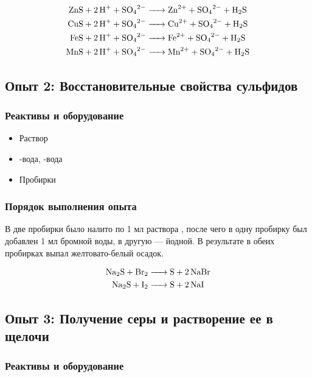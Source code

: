 \documentclass[a4paper, 12pt]{article}
\begin{document}
\begin{align}
	\ce{ZnS + 2H+ + SO4^2- &-> Zn^2+ + SO4^2- + H2S}\\
	\ce{CuS + 2H+ + SO4^2- &-> Cu^2+ + SO4^2- + H2S}\\
	\ce{FeS + 2H+ + SO4^2- &-> Fe^2+ + SO4^2- + H2S}\\
	\ce{MnS + 2H+ + SO4^2- &-> Mn^2+ + SO4^2- + H2S}
\end{align}

\subsection{Опыт 2: Восстановительные свойства сульфидов}

\subsubsection{Реактивы и оборудование}

\begin{itemize}
	\item Раствор 
	
	\item {}-вода, -вода
	
	\item Пробирки
\end{itemize}

\subsubsection{Порядок выполнения опыта}

В две пробирки было налито по 1 мл раствора , после чего в одну пробирку был добавлен 1 мл бромной воды, в другую --- йодной. В результате в обеих пробирках выпал желтовато-белый осадок.

\begin{align}
	\ce{Na2S + Br2 &-> S + 2NaBr}\\
	\ce{Na2S + I2 &-> S + 2NaI}
\end{align}

\subsection{Опыт 3: Получение серы и растворение ее в щелочи}

\subsubsection{Реактивы и оборудование}
\end{document}
